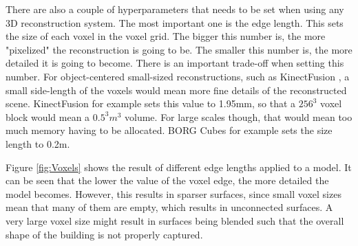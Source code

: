 \documentclass[11pt]{article}
\begin{document}
There are also a couple of hyperparameters that needs to be set when using any 3D reconstruction system. The most important one is the edge length. This sets the size of each voxel in the voxel grid. The bigger this number is, the more "pixelized" the reconstruction is going to be. The smaller this number is, the more detailed it is going to become. There is an important trade-off when setting this number. For object-centered small-sized reconstructions, such as KinectFusion \cite{kinectfusion}, a small side-length of the voxels would mean more fine details of the reconstructed scene. KinectFusion for example sets this value to	 1.95mm, so that a $256^3$ voxel block would mean a $0.5^3 m^3$ volume. For large scales though, that would mean too much memory having to be allocated. BORG Cubes for example sets the size length to 0.2m.
	
Figure \ref{fig:Voxels} shows the result of different edge lengths applied to a model. It can be seen that the lower the value of the voxel edge, the more detailed the model becomes. However, this results in sparser surfaces, since small voxel sizes mean that many of them are empty, which results in unconnected surfaces. A very large voxel size might result in surfaces being blended such that the overall shape of the building is not properly captured.
\end{document}
